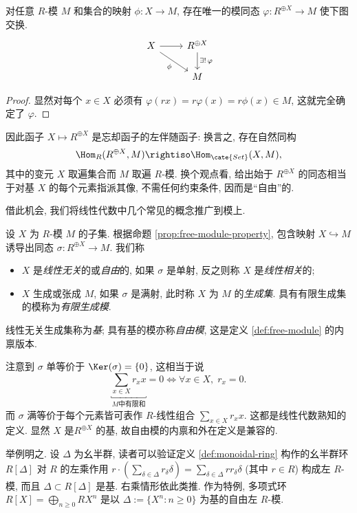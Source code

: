 \begin{proposition}\label{prop:free-module-property}
	对任意 $R$-模 $M$ 和集合的映射 $\phi: X \to M$, 存在唯一的模同态 $\varphi: R^{\oplus X} \to M$ 使下图交换.
	\[ \begin{tikzcd}
		X \arrow[rd, "\phi"'] \arrow[r] & R^{\oplus X} \arrow[d, "{\exists! \, \varphi}"] \\
		& M
	\end{tikzcd} \]
\end{proposition}
\begin{proof}
	显然对每个 $x \in X$ 必须有 $\varphi(rx) = r\varphi(x) = r\phi(x) \in M$, 这就完全确定了 $\varphi$.
\end{proof}
因此函子 $X \mapsto R^{\oplus X}$ 是忘却函子的左伴随函子: 换言之, 存在自然同构
\[ \Hom_R(R^{\oplus X}, M) \rightiso \Hom_\cate{Set}(X, M), \]
其中的变元 $X$ 取遍集合而 $M$ 取遍 $R$-模. 换个观点看, 给出始于 $R^{\oplus X}$ 的同态相当于对基 $X$ 的每个元素指派其像, 不需任何约束条件, 因而是``自由''的.

借此机会, 我们将线性代数中几个常见的概念推广到模上.
\begin{definition}
	设 $X$ 为 $R$-模 $M$ 的子集. 根据命题 \ref{prop:free-module-property}, 包含映射 $X \hookrightarrow M$ 诱导出同态 $\sigma: R^{\oplus X} \to M$. 我们称
	\begin{itemize}
		\item $X$ 是\emph{线性无关}的或\emph{自由}的, 如果 $\sigma$ 是单射, 反之则称 $X$ 是\emph{线性相关}的;
		\item $X$ 生成或张成 $M$, 如果 $\sigma$ 是满射, 此时称 $X$ 为 $M$ 的\emph{生成集}. 具有有限生成集的模称为\emph{有限生成模}.
	\end{itemize}
	线性无关生成集称为\emph{基}; 具有基的模亦称\emph{自由模}, 这是定义 \ref{def:free-module} 的内禀版本.
\end{definition}
注意到 $\sigma$ 单等价于 $\Ker(\sigma)=\{0\}$, 这相当于说
\[ \underbracket{\sum_{x \in X} r_x x}_{M \text{中有限和}} = 0 \iff \forall x \in X, \; r_x = 0. \]
而 $\sigma$ 满等价于每个元素皆可表作 $R$-线性组合 $\sum_{x \in X} r_x x$. 这都是线性代数熟知的定义. 显然 $X$ 是$R^{\oplus X}$ 的基, 故自由模的内禀和外在定义是兼容的.

举例明之. 设 $\Delta$ 为幺半群, 读者可以验证定义 \ref{def:monoidal-ring} 构作的幺半群环 $R[\Delta]$ 对 $R$ 的左乘作用 $r\cdot(\sum_{\delta \in \Delta} r_\delta \delta) = \sum_{\delta \in \Delta} rr_\delta \delta$ (其中 $r \in R$) 构成左 $R$-模, 而且 $\Delta \subset R[\Delta]$ 是基. 右乘情形依此类推. 作为特例, 多项式环 $R[X] = \bigoplus_{n \geq 0 }RX^n$ 是以 $\Delta := \{ X^n: n \geq 0 \}$ 为基的自由左 $R$-模.

